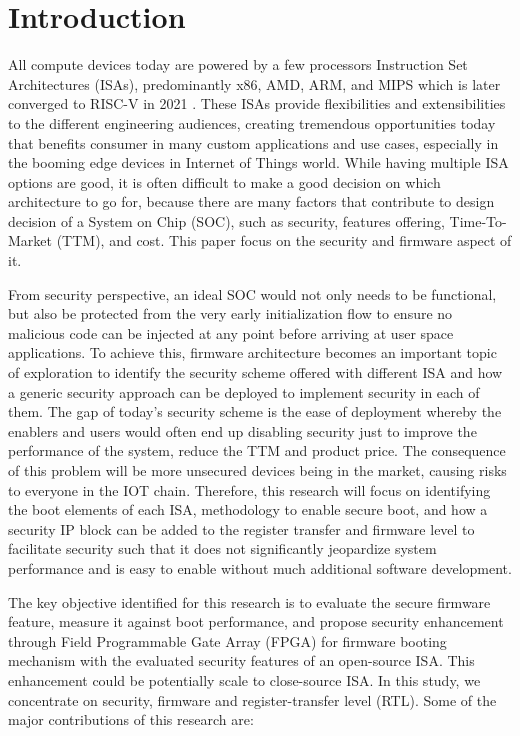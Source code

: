 \documentclass[review]{elsarticle}
\begin{document}
\section{Introduction}

All compute devices today are powered by a few processors Instruction Set Architectures
(ISAs), predominantly x86, AMD, ARM, and MIPS which is later converged to RISC-V in
2021 \cite{R5:1}. These ISAs provide flexibilities and extensibilities to the
different engineering audiences, creating tremendous opportunities today that benefits
consumer in many custom applications and use cases, especially in the booming edge devices
in Internet of Things world. While having multiple ISA options are good, it is often difficult to
make a good decision on which architecture to go for, because there are many factors that
contribute to design decision of a System on Chip (SOC), such as security, features offering,
Time-To-Market (TTM), and cost. This paper focus on the security and firmware aspect of it.

From security perspective, an ideal SOC would not only needs to be functional, but also be protected
from the very early initialization flow to ensure no malicious code can be injected at any point before arriving at
user space applications. To achieve this, firmware architecture becomes an important topic
of exploration to identify the security scheme offered with different ISA and how a generic
security approach can be deployed to implement security in each of them. The gap of today’s
security scheme is the ease of deployment whereby the enablers and users would often end up
disabling security just to improve the performance of the system, reduce the TTM and product price.
The consequence of this problem will be more unsecured devices being in the market,
causing risks to everyone in the IOT chain. Therefore, this research will focus on identifying the
boot elements of each ISA, methodology to enable secure boot, and how a security IP block
can be added to the register transfer and firmware level to facilitate security such that it
does not significantly jeopardize system performance and is easy to enable without much
additional software development.

The key objective identified for this research is to
evaluate the secure firmware feature, measure it against boot performance, and propose
security enhancement through Field Programmable Gate Array (FPGA) for firmware booting
mechanism with the evaluated security features of an open-source ISA. This enhancement
could be potentially scale to close-source ISA. In this study, we concentrate on security, firmware and 
register-transfer level (RTL). Some of the major contributions of this research are:
\end{document}

